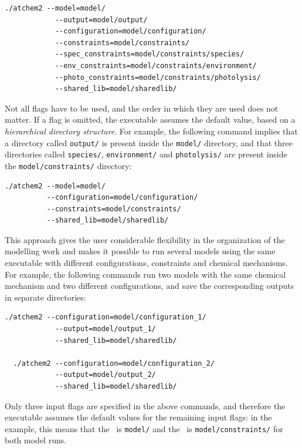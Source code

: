 \begin{Verbatim}[fontsize=\small]
  ./atchem2 --model=model/
            --output=model/output/
            --configuration=model/configuration/
            --constraints=model/constraints/
            --spec_constraints=model/constraints/species/
            --env_constraints=model/constraints/environment/
            --photo_constraints=model/constraints/photolysis/
            --shared_lib=model/sharedlib/
\end{Verbatim}

Not all flags have to be used, and the order in which they are used does not matter. If a flag
is omitted, the executable assumes the default value, based on a \emph{hierarchical directory
  structure}. For example, the following command implies that a directory called
\texttt{output/} is present inside the \texttt{model/} directory, and that three directories
called \texttt{species/}, \texttt{environment/} and \texttt{photolysis/} are present inside the
\texttt{model/constraints/} directory:

\begin{Verbatim}[fontsize=\small]
./atchem2 --model=model/
          --configuration=model/configuration/
          --constraints=model/constraints/
          --shared_lib=model/sharedlib/
\end{Verbatim}

This approach gives the user considerable flexibility in the organization of the modelling work
and makes it possible to run several models using the same executable with different
configurations, constraints and chemical mechanisms. For example, the following commands run
two models with the same chemical mechanism and two different configurations, and save the
corresponding outputs in separate directories:

\begin{Verbatim}[fontsize=\small]
  ./atchem2 --configuration=model/configuration_1/
            --output=model/output_1/
            --shared_lib=model/sharedlib/

  ./atchem2 --configuration=model/configuration_2/
            --output=model/output_2/
            --shared_lib=model/sharedlib/
\end{Verbatim}

Only three input flags are specified in the above commands, and therefore the executable
assumes the default values for the remaining input flags: in the example, this means that the
\modeldir\ is \texttt{model/} and the \constrdir\ is \texttt{model/constraints/} for both model
runs.

